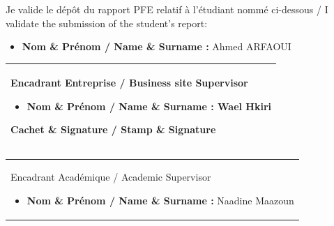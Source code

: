 \documentclass[12pt,a4paper,twoside]{report}
\newcommand{\supervisorName}{Naadine Maazoun}
\begin{document}
{%
\setlength{\parindent}{0pt}
\setlength{\parskip}{0.5em}

Je valide le dépôt du rapport PFE relatif à l'étudiant nommé ci-dessous / I validate the submission of the student's report:

\begin{itemize}
  \item \textbf{Nom \& Prénom / Name \& Surname :} Ahmed ARFAOUI
\end{itemize}

\vspace{1.2cm}

\begin{center}
\begin{tabular}{|p{14cm}|}
\hline
\vspace{0.4cm}
\begin{center}
{\large Encadrant Entreprise / Business site Supervisor}
\end{center}
\vspace{0.6cm}

\begin{itemize}
  \item \textbf{Nom \& Prénom / Name \& Surname :} Wael Hkiri
\end{itemize}

\vspace{0.3cm}
\begin{center}
\textbf{Cachet \& Signature / Stamp \& Signature}
\end{center}

\vspace{3.5cm}
\\
\hline
\end{tabular}
\end{center}

\vspace{1.0cm}

\begin{center}
\begin{tabular}{|p{14cm}|}
\hline
\vspace{0.4cm}
\begin{center}
{\large Encadrant Académique / Academic Supervisor}
\end{center}
\vspace{0.6cm}

\begin{itemize}
  \item \textbf{Nom \& Prénom / Name \& Surname :} \supervisorName
\end{itemize}


\end{tabular}
\end{center}}
\end{document}
